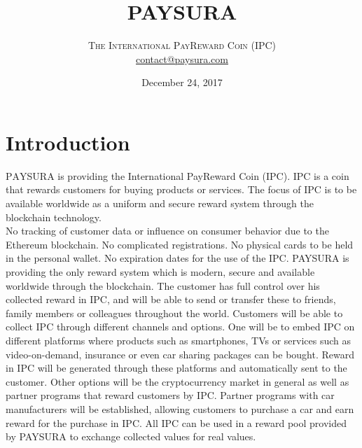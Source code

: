 \documentclass[twoside,onecolumn]{article}
\title{PAYSURA} %
\author{%
\textsc{The International PayReward Coin (IPC)} \\[1ex] %
\normalsize \href{mailto:contact@paysura.com}{contact@paysura.com} %
}
\date{December 24, 2017} %
\begin{document}
\maketitle


\section{Introduction}

\lettrine[nindent=0em,lines=3]{P}AYSURA is providing the International PayReward Coin (IPC). IPC is a coin that rewards 
customers for buying products or services. The focus of IPC is to be available worldwide as a uniform and secure reward system through the blockchain technology.\\
No tracking of customer data or influence on consumer behavior due to the Ethereum blockchain. No complicated registrations. No physical cards to be held in the personal wallet. No expiration dates for the use of the IPC. PAYSURA is providing the only reward system which is modern, secure and available worldwide through the blockchain. The customer has full control over his collected reward in IPC, and will be able to send or transfer these to friends, family members or colleagues throughout the world. 
Customers will be able to collect IPC through different channels and options. One will be to embed IPC on different platforms where products such as smartphones, TVs or services such as video-on-demand, insurance or even car sharing packages can be bought. Reward in IPC will be generated through these platforms and automatically sent to the customer. 
Other options will be the cryptocurrency market in general as well as partner programs that reward customers by IPC. Partner programs with car manufacturers will be established, allowing customers to purchase a car and earn reward for the purchase in IPC. All IPC can be used in a reward pool provided by PAYSURA to exchange collected values for real values. 


\end{document}
